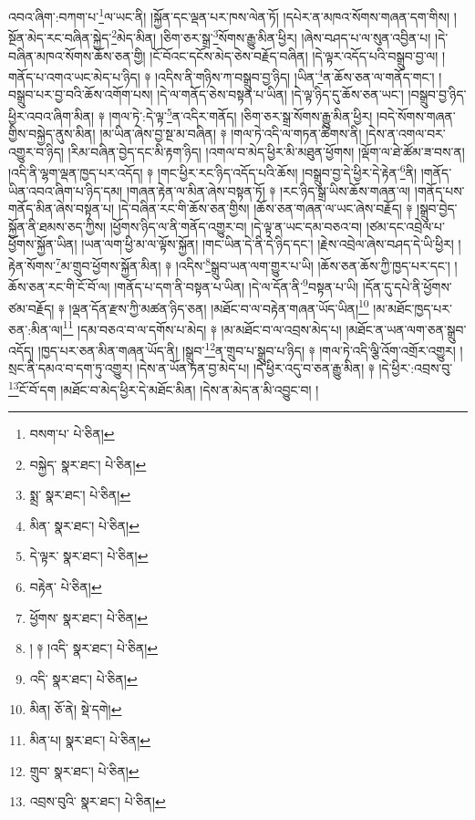 འབའ་ཞིག་:བཀག་པ་\footnote{བསག་པ་  པེ་ཅིན། }ལ་ཡང་ནི། །སྐྱོན་དང་ལྡན་པར་ཁས་ལེན་ཏོ། །དཔེར་ན་མཁའ་སོགས་གཞན་དག་གིས། །སྔོན་མེད་རང་བཞིན་སྐྱེད་\footnote{བསྐྱེད་  སྣར་ཐང་།  པེ་ཅིན། }མེད་མིན། །ཅིག་ཅར་སྒྲ་\footnote{སྨྲ་  སྣར་ཐང་།  པེ་ཅིན། }སོགས་རྒྱུ་མིན་ཕྱིར། །ཞེས་བཤད་པ་ལ་སུན་འབྱིན་པ། །དེ་བཞིན་མཁའ་སོགས་ཆོས་ཅན་གྱི། །ངོ་བོའང་དངོས་མེད་ཅེས་བརྗོད་བཞིན། །དེ་ལྟར་འདོད་པའི་བསྒྲུབ་བྱ་ལ། །གནོད་པ་འགའ་ཡང་མེད་པ་ཉིད། ༈ །འདིས་ནི་གཉིས་ཀ་བསྒྲུབ་བྱ་ཉིད། །ཡིན་\footnote{མིན་  སྣར་ཐང་།  པེ་ཅིན། }ན་ཆོས་ཅན་ལ་གནོད་གང་། །བསྒྲུབ་པར་བྱ་བའི་ཆོས་འགོག་པས། །དེ་ལ་གནོད་ཅེས་བསྟན་པ་ཡིན། །དེ་ལྟ་ཉིད་དུ་ཆོས་ཅན་ཡང་། །བསྒྲུབ་བྱ་ཉིད་ཕྱིར་འབའ་ཞིག་མིན། ༈ །གལ་ཏེ་:དེ་ལྟ་\footnote{དེ་ལྟར་  སྣར་ཐང་།  པེ་ཅིན། }ན་འདིར་གནོད། །ཅིག་ཅར་སྒྲ་སོགས་རྒྱུ་མིན་ཕྱིར། །བདེ་སོགས་གཞན་གྱིས་བསྐྱེད་ནུས་མིན། །མ་ཡིན་ཞེས་བྱ་སྔ་མ་བཞིན། ༈ །གལ་ཏེ་འདི་ལ་གཏན་ཚིགས་ནི། །དེས་ན་འགལ་བར་འགྱུར་བ་ཉིད། །རིམ་བཞིན་བྱེད་དང་མི་རྟག་ཉིད། །འགལ་བ་མེད་ཕྱིར་མི་མཐུན་ཕྱོགས། །ལྡོག་ལ་ཐེ་ཚོམ་ཟ་བས་ན། །འདི་ནི་ལྷག་ལྡན་ཁྱད་པར་འདོད། ༈ །གང་ཕྱིར་རང་ཉིད་འདོད་པའི་ཆོས། །བསྒྲུབ་བྱ་དེ་ཕྱིར་དེ་རྟེན་\footnote{བརྟེན་  པེ་ཅིན། }ནི། །གནོད་ཡིན་འབའ་ཞིག་པ་ཉིད་དམ། །གཞན་རྟེན་ལ་མིན་ཞེས་བསྟན་ཏོ། ༈ །རང་ཉིད་སྒྲ་ཡིས་ཆོས་གཞན་ལ། །གནོད་པས་གནོད་མིན་ཞེས་བསྟན་པ། །དེ་བཞིན་རང་གི་ཆོས་ཅན་གྱིས། །ཆོས་ཅན་གཞན་ལ་ཡང་ཞེས་བརྗོད། ༈ །སྒྲུབ་བྱེད་སྐྱོན་ནི་ཐམས་ཅད་ཀྱིས། །ཕྱོགས་ཉིད་ལ་ནི་གནོད་འགྱུར་བ། །དེ་ལྟ་ན་ཡང་དམ་བཅའ་བ། །ཙམ་དང་འབྲེལ་པ་ཕྱོགས་སྐྱོན་ཡིན། །ཡན་ལག་ཕྱི་མ་ལ་ལྟོས་སྐྱོན། །གང་ཡིན་དེ་ནི་དེ་ཉིད་དང་། །རྗེས་འབྲེལ་ཞེས་བཤད་དེ་ཡི་ཕྱིར། །རྟེན་སོགས་\footnote{ཕྱོགས་  སྣར་ཐང་།  པེ་ཅིན། }མ་གྲུབ་ཕྱོགས་སྐྱོན་མིན། ༈ །འདིས་\footnote{། ༈ །འདི་  སྣར་ཐང་།  པེ་ཅིན། }སྒྲུབ་ཡན་ལག་གྱུར་པ་ཡི། །ཆོས་ཅན་ཆོས་ཀྱི་ཁྱད་པར་དང་། །ཆོས་ཅན་རང་གི་ངོ་བོ་ལ། །གནོད་པ་དག་ནི་བསྟན་པ་ཡིན། །དེ་ལ་དོན་ནི་\footnote{འདི་  སྣར་ཐང་།  པེ་ཅིན། }བསྟན་པ་ཡི། །དོན་དུ་དཔེ་ནི་ཕྱོགས་ཙམ་བརྗོད། ༈ །ལྡན་དོན་རྫས་ཀྱི་མཚན་ཉིད་ཅན། །མཐོང་བ་ལ་བརྟེན་གཞན་ཡོད་ཡིན།\footnote{མིན།  ཅོ་ནེ།  སྡེ་དགེ། } །མ་མཐོང་ཁྱད་པར་ཅན་:མིན་ལ།\footnote{མིན་པ།  སྣར་ཐང་།  པེ་ཅིན། } །དམ་བཅའ་བ་ལ་དགོས་པ་མེད། ༈ །མ་མཐོང་བ་ལ་འབྲས་མེད་པ། །མཐོང་ན་ཡན་ལག་ཅན་སྒྲུབ་འདོད། །ཁྱད་པར་ཅན་མིན་གཞན་ཡོད་ནི། །སྒྲུབ་\footnote{གྲུབ་  སྣར་ཐང་།  པེ་ཅིན། }ན་གྲུབ་པ་སྒྲུབ་པ་ཉིད། ༈ །གལ་ཏེ་འདི་ལྕི་འོག་འགྲོར་འགྱུར། །སྲང་ནི་དམའ་བ་དག་ཏུ་འགྱུར། །དེས་ན་ཡོན་ཏན་བྱ་མེད་པ། །དེ་ཕྱིར་འདུ་བ་ཅན་རྒྱུ་མིན། ༈ །དེ་ཕྱིར་:འབྲས་བུ་\footnote{འབྲས་བུའི་  སྣར་ཐང་།  པེ་ཅིན། }ངོ་བོ་དག །མཐོང་བ་མེད་ཕྱིར་དེ་མཐོང་མིན། །དེས་ན་མེད་ན་མི་འབྱུང་བ། །
